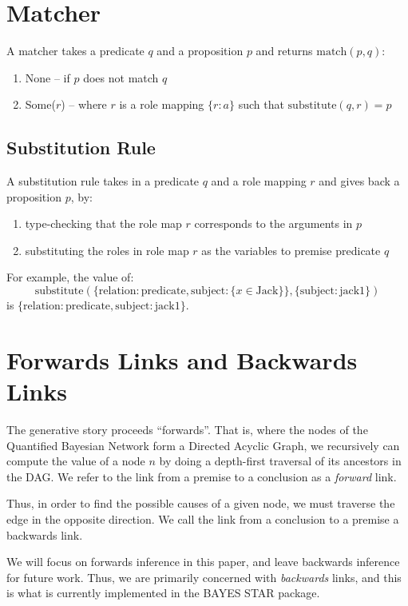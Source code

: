 \documentclass[12pt]{article}
\begin{document}
\section{Matcher}
A matcher takes a predicate \( q \) and a proposition \( p \) and returns \( \text{match}(p, q) \):
\begin{enumerate}
    \item None -- if \( p \) does not match \( q \)
    \item Some(\( r \)) -- where \( r \) is a role mapping \( \{r: a\} \) such that \( \text{substitute}(q, r) = p \)
\end{enumerate}

\subsection*{Substitution Rule}
A substitution rule takes in a predicate \( q \) and a role mapping \( r \) and gives back a proposition \( p \), by:
\begin{enumerate}
    \item type-checking that the role map \( r \) corresponds to the arguments in \( p \)
    \item substituting the roles in role map \( r \) as the variables to premise predicate \( q \)
\end{enumerate}

For example, the value of:
\[ \text{substitute}(\{\text{relation}: \text{predicate}, \text{subject}:\{x \in \text{Jack}\}\}, \{\text{subject}:\text{jack1}\}) \]
is \( \{\text{relation}: \text{predicate}, \text{subject}:\text{jack1}\} \).



\section{Forwards Links and Backwards Links}
The generative story proceeds ``forwards''.
That is, where the nodes of the Quantified Bayesian Network form a Directed Acyclic Graph, we recursively can compute the value of a node \( n \) by doing a depth-first traversal of its ancestors in the DAG.
We refer to the link from a premise to a conclusion as a \emph{forward} link.

Thus, in order to find the possible causes of a given node, we must traverse the edge in the opposite direction.
We call the link from a conclusion to a premise a backwards link.

We will focus on forwards inference in this paper, and leave backwards inference for future work.
Thus, we are primarily concerned with \emph{backwards} links, and this is what is currently implemented in the BAYES STAR package.
\end{document}
